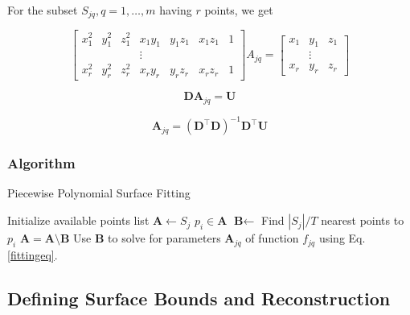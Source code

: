\documentclass[12pt,a4paper]{article}
\begin{document}
    \noindent For the subset  $S_{jq}, q=1,\dots,m$ having $r$ points, we get
    
    \begin{equation}
    \left[\begin{array}{ccccccc}{x_{1}^{2}}&{y_{1}^{2}}&{z_{1}^{2}}&{x_{1}y_{1}}&{y_{1}z_{1}}&{x_{1}z_{1}}&{1}\\{}&{}&{}&{\vdots}&{}&{}&{}\\{x_{r}^{2}}&{y_{r}^{2}}&{z_{r}^{2}}&{x_{r}y_{r}}&{y_{r}z_{r}}&{x_{r}z_{r}}&{1}\end{array}\right]A_{jq}=\left[\begin{array}{ccc}{x_{1}}&{y_{1}}&{z_{1}}\\{}&{\vdots}&{}\\{x_{r}}&{y_{r}}&{z_{r}}\end{array}\right]
    \end{equation}
    
    \begin{equation}
    \textbf{D} \textbf{A}_{jq}=\textbf{U}
    \end{equation}
    
    \begin{equation}\label{fittingeq}
    \textbf{A}_{jq}=\left(\textbf{D}^\top \textbf{D}\right)^{-1}\textbf{D}^\top \textbf{U}
    \end{equation}
    
    \subsubsection{Algorithm}
    \begin{algorithm}[H]
        \caption{Piecewise Polynomial Surface Fitting}
        \begin{algorithmic}
            \State Initialize available points list $\textbf{A} \leftarrow S_j$
            \State $p_i \in \textbf{A}$
            \State $\textbf{B} \leftarrow$ Find $|S_j|/T$ nearest points to $p_i$ 
            \State $\textbf{A} = \textbf{A} \setminus \textbf{B}$
            \State Use $\textbf{B}$ to solve for parameters $\textbf{A}_{jq}$ of function $f_{jq}$ using Eq. \ref{fittingeq}.
            \EndWhile 
            \EndFor
        \end{algorithmic}
    \end{algorithm}
    
    
    
    \subsection{Defining Surface Bounds and Reconstruction}
    
\end{document}
